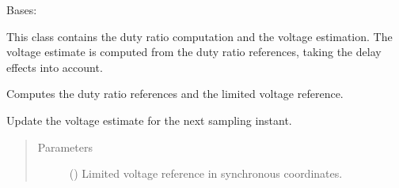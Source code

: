 \documentclass[letterpaper,10pt,english]{sphinxmanual}
\begin{document}
\begin{fulllineitems}
\label{\detokenize{control:control.common.PWM}}
\pysigstartsignatures
{}
\pysigstopsignatures
\sphinxAtStartPar
Bases: 

\sphinxAtStartPar
This class contains the duty ratio computation and the voltage estimation.
The voltage estimate is computed from the duty ratio references, taking
the delay effects into account.

\begin{fulllineitems}
\label{\detokenize{control:control.common.PWM.output}}
\pysigstartsignatures
{}
\pysigstopsignatures
\sphinxAtStartPar
Computes the duty ratio references and the limited voltage reference.

\end{fulllineitems}


\begin{fulllineitems}
\label{\detokenize{control:control.common.PWM.update}}
\pysigstartsignatures
{}
\pysigstopsignatures
\sphinxAtStartPar
Update the voltage estimate for the next sampling instant.
\begin{quote}\begin{description}
\item[{Parameters}] \leavevmode
\sphinxAtStartPar
{} () \textendash{} Limited voltage reference in synchronous coordinates.

\end{description}\end{quote}

\end{fulllineitems}


\end{fulllineitems}
\end{document}
